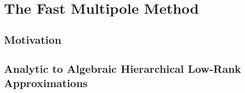 \chapter{The Fast Multipole Method}\label{chpt:1}


\section{Motivation}\label{sec:1_1_motivation}


\section{Analytic to Algebraic Hierarchical Low-Rank Approximations}\label{sec:1_2}



